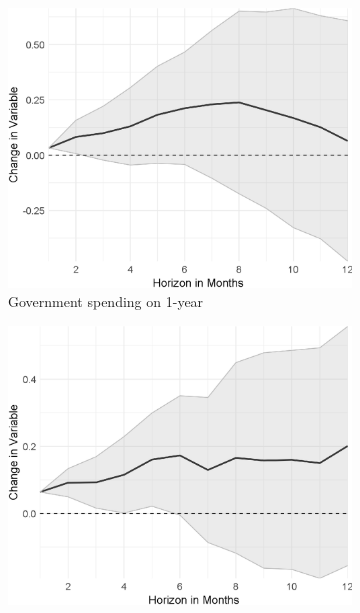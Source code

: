 
\begin{figure}[H]
	\centering
	\captionsetup{font=footnotesize}
	\begin{subfigure}{00.32\textwidth}
	\includegraphics[width=1\textwidth]{output/lp/baseline/level/government_spending/government_spendingonexpectations1y_djn.eps}
	\caption{Government spending on 1-year}
\end{subfigure}
\begin{subfigure}{00.32\textwidth}
	\includegraphics[width=1\textwidth]{output/lp/baseline/level/monetary_policy/monetary_policyonexpectations1y_djn.eps}

\end{subfigure}
\end{figure}
